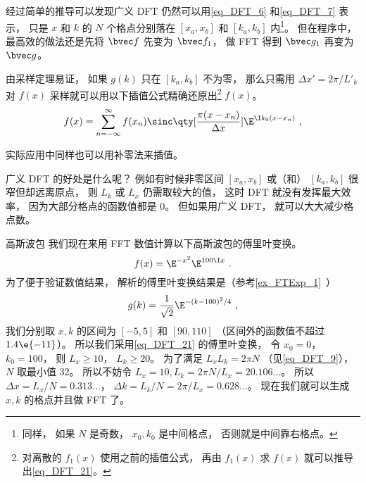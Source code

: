 经过简单的推导可以发现广义 DFT 仍然可以用\autoref{eq_DFT_6} 和\autoref{eq_DFT_7} 表示， 只是 $x$ 和 $k$ 的 $N$ 个格点分别落在 $[x_a, x_b]$ 和 $[k_a, k_b]$ 内\footnote{同样， 如果 $N$ 是奇数， $x_0, k_0$ 是中间格点， 否则就是中间靠右格点。}。 但在程序中， 最高效的做法还是先将 $\bvec f$ 先变为 $\bvec f_1$， 做 FFT 得到 $\bvec g_1$ 再变为 $\bvec g$。

由采样定理易证， 如果 $g(k)$ 只在 $[k_a, k_b]$ 不为零， 那么只需用 $\Delta x' = 2\pi/L'_k$ 对 $f(x)$ 采样就可以用以下插值公式精确还原出\footnote{对离散的 $f_1(x)$ 使用之前的插值公式， 再由 $f_1(x)$ 求 $f(x)$ 就可以推导出\autoref{eq_DFT_21}。} $f(x)$。
\begin{equation}\label{eq_DFT_21}
f(x) = \sum_{n = -\infty}^{\infty} f(x_n)\sinc\qty[\frac{\pi(x - x_n)}{\Delta x}] \E^{\I k_0 (x-x_n)}~,
\end{equation}

实际应用中同样也可以用补零法来插值。

广义 DFT 的好处是什么呢？ 例如有时候非零区间 $[x_a, x_b]$ 或（和） $[k_a, k_b]$ 很窄但却远离原点， 则 $L_k$ 或 $L_x$ 仍需取较大的值， 这时 DFT 就没有发挥最大效率， 因为大部分格点的函数值都是 0。 但如果用广义 DFT， 就可以大大减少格点数。

\begin{example}{高斯波包}
我们现在来用 FFT 数值计算以下高斯波包的傅里叶变换。
\begin{equation}
f(x) = \E^{-x^2}\E^{100 \I x}~.
\end{equation}
为了便于验证数值结果， 解析的傅里叶变换结果是（参考\autoref{ex_FTExp_1}~）
\begin{equation}
g(k) = \frac{1}{\sqrt2}\E^{-(k-100)^2/4}~,
\end{equation}
我们分别取 $x, k$ 的区间为 $[-5, 5]$ 和 $[90, 110]$ （区间外的函数值不超过 $1.4\e{-11}$）。 所以我们采用\autoref{eq_DFT_21} 的傅里叶变换， 令 $x_0 = 0$， $k_0 = 100$， 则 $L_x \geqslant 10$， $L_k \geqslant 20$。 为了满足 $L_x L_k = 2\pi N$ （见\autoref{eq_DFT_9}）， $N$ 取最小值 32。 所以不妨令 $L_x = 10, L_k = 2\pi N/L_x = 20.106...$。
所以 $\Delta x = L_x/N = 0.313...$， $\Delta k = L_k/N = 2\pi/L_x = 0.628...$。 现在我们就可以生成 $x, k$ 的格点并且做 FFT 了。
\end{example}
